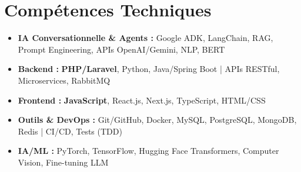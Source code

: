 \documentclass[a4paper,11pt]{article}
\begin{document}
\section{Compétences Techniques}
\begin{itemize}[leftmargin=*, nosep]
    \item \small{\textbf{IA Conversationnelle \& Agents :} Google ADK, LangChain, RAG, Prompt Engineering, APIs OpenAI/Gemini, NLP, BERT}
    \item \small{\textbf{Backend :} \textbf{PHP/Laravel}, Python, Java/Spring Boot | APIs RESTful, Microservices, RabbitMQ}
    \item \small{\textbf{Frontend :} \textbf{JavaScript}, React.js, Next.js, TypeScript, HTML/CSS}
    \item \small{\textbf{Outils \& DevOps :} Git/GitHub, Docker, MySQL, PostgreSQL, MongoDB, Redis | CI/CD, Tests (TDD)}
    \item \small{\textbf{IA/ML :} PyTorch, TensorFlow, Hugging Face Transformers, Computer Vision, Fine-tuning LLM}
\end{itemize}

\end{document}
